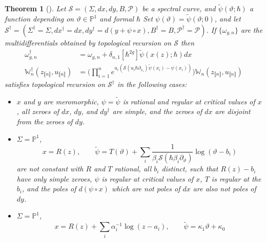 \documentclass[10pt,a4paper,oneside,no-math,reqno]{amsart}%
\theoremstyle{plain}
\newtheorem{theorem}{Theorem}[section]
\theoremstyle{definition}
\theoremstyle{remark}
\numberwithin{equation}{section}
\renewcommand{\theta}{\vartheta}
\newcommand{\mb}[1]{\mathbb{#1}}
\newcommand{\mc}[1]{\mathcal{#1}}
\newcommand{\1}{\mathds{1}}
\renewcommand{\P}{\mb{P}}
\newcommand{\<}{\langle}
\renewcommand{\>}{\rangle}
\newcommand{\del}{\partial}
\begin{document}
\begin{theorem}[{\cite[Section 6]{ABDKS24}}]\label{ThmSD}
    Let $ \mc{S} = ( \Sigma, dx, dy, B, \mc{P}) $ be a spectral curve, and $ \tilde{\psi} (\theta ;\hbar ) $ a function depending on $ \theta \in \P^1$ and formal $ \hbar$ Set $ \psi (\theta ) = \tilde{\psi}(\theta; 0)$, and let $ \mc{S}^\dagger = ( \Sigma^\dagger = \Sigma, dx^\dagger = dx , dy^\dagger = d( y + \psi \circ x), B^\dagger = B, \mc{P}^\dagger = \mc{P}) $. If $ \{ \omega _{g,n} \} $ are the multidifferentials obtained by topological recursion on $ \mc{S}$ then
    \begin{align}
        \omega_{g,n}^\dagger
        &=
        \omega_{g,n} + \delta_{n,1} [\hbar^{2g} ] \tilde{\psi} (x (z); \hbar ) dx
        \\
        \mb{W}^\dagger_n (z_{\llbracket n \rrbracket}, u_{\llbracket n \rrbracket })
        &=
        \bigg( \prod_{i=1}^n e^{u_i ( \mc{S}(u_i \hbar \del_{x_i}) \tilde{\psi}(x_i ) - \psi(x_i))}\bigg) \mb{W}_n (z_{\llbracket n \rrbracket}, u_{\llbracket n \rrbracket}) \label{ExtendedSD}
    \end{align}
    satisfies topological recursion on $ \mc{S}^\dagger$ in the following cases:
    \begin{itemize}
        \item $x$ and $y$ are meromorphic, $ \psi = \tilde{\psi} $ is rational and regular at critical values of $ x$, all zeroes of $ dx$, $dy$, and $ dy^\dagger$ are simple, and the zeroes of $ dx $ are disjoint from the zeroes of $ dy$.
        \item $ \Sigma = \P^1$, 
        \begin{equation}
            x 
            = R(z), 
            \qquad
            \tilde{\psi} 
            = 
            T (\theta ) + \sum_i \frac{1}{\beta_i \mc{S} (\hbar \beta_i \del_\theta)} \log (\theta - b_i)
        \end{equation}
        are not constant with $ R $ and $ T $ rational, all $ b_i $ distinct, such that $ R(z) - b_i$ have only simple zeroes, $ \psi $ is regular at critical values of $ x$, $T$ is regular at the $b_i$, and the poles of $ d( \psi \circ x) $ which are not poles of $ dx $ are also not poles of $ dy$.
        \item $ \Sigma = \P^1$,
        \begin{equation}
            x 
            =
            R(z) + \sum_i \alpha_i^{-1} \log (z - a_i),
            \qquad
            \tilde{\psi} 
            = 
            \kappa_1 \theta + \kappa_0
        \end{equation} 

\end{itemize}
\end{theorem}
\end{document}

